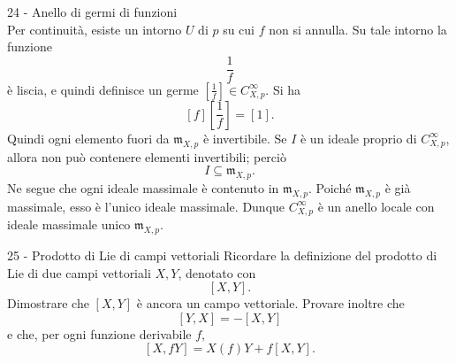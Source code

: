 \documentclass[a4paper]{article}
\begin{document}
\begin{snippetsolution}{24 - Anello di germi di funzioni}
\[    \]
    Per continuità, esiste un intorno \(U\) di \(p\) su cui \(f\) non si annulla. Su tale intorno la funzione
    \[
        \frac1f
    \]
    è liscia, e quindi definisce un germe \(\left[\frac1f\right]\in C^\infty_{X,p}\). Si ha
    \[
        [f]\left[\frac1f\right]=[1].
    \]
    Quindi ogni elemento fuori da \(\mathfrak{m}_{X,p}\) è invertibile.
    Se \(I\) è un ideale proprio di \(C^\infty_{X,p}\), allora non può contenere elementi invertibili; perciò
    \[
        I\subseteq\mathfrak{m}_{X,p}.
    \]
    Ne segue che ogni ideale massimale è contenuto in \(\mathfrak{m}_{X,p}\). Poiché \(\mathfrak{m}_{X,p}\) è già massimale, esso è l'unico ideale massimale. Dunque \(C^\infty_{X,p}\) è un anello locale con ideale massimale unico \(\mathfrak{m}_{X,p}\).
\end{snippetsolution}

\begin{snippetexercise}{25 - Prodotto di Lie di campi vettoriali}
    Ricordare la definizione del prodotto di Lie di due campi
    vettoriali \(X,Y\), denotato con
    \[
        [X,Y].
    \]
    Dimostrare che \([X,Y]\) è ancora un campo vettoriale. Provare inoltre che
    \[
        [Y,X]=-[X,Y]
    \]
    e che, per ogni funzione derivabile \(f\),
    \[
        [X,fY]=X(f)Y+f[X,Y].
    \]
\end{snippetexercise}
\end{document}
